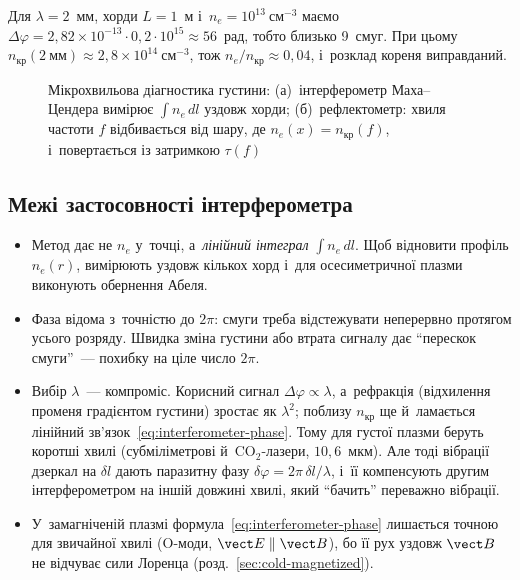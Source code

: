 \begin{Estimate}
Для $\lambda=2$~мм, хорди $L=1$~м і~$n_e=10^{13}~\text{см}^{-3}$ маємо
$\Delta\varphi=2{,}82\times10^{-13}\cdot0{,}2\cdot10^{15}\approx56$~рад, тобто близько 9~смуг. При
цьому $n_{\mathrm{кр}}(2~\text{мм})\approx2{,}8\times10^{14}~\text{см}^{-3}$, тож $n_e/n_{\mathrm{кр}}\approx0{,}04$,
і~розклад кореня виправданий.
\end{Estimate}

\begin{figure}[ht]\centering
	\begin{subfigure}[t]{0.5\linewidth}\centering
		\caption{}
	\end{subfigure}%
	\begin{subfigure}[t]{0.5\linewidth}\centering
		\caption{}
	\end{subfigure}
	\caption{Мікрохвильова діагностика густини: (а)~інтерферометр Маха--Цендера вимірює
	$\int n_e\,dl$ уздовж хорди; (б)~рефлектометр: хвиля частоти $f$ відбивається від шару, де
	$n_e(x)=n_{\mathrm{кр}}(f)$, і~повертається із затримкою $\tau(f)$}
	\label{pic:wave-diagnostics}
\end{figure}

\subsection*{Межі застосовності інтерферометра}

\begin{itemize}
	\item Метод дає не $n_e$ у~точці, а~\emph{лінійний інтеграл} $\int n_e\,dl$. Щоб відновити профіль
	$n_e(r)$, вимірюють уздовж кількох хорд і~для осесиметричної плазми виконують обернення Абеля.
	\item Фаза відома з~точністю до $2\pi$: смуги треба відстежувати неперервно протягом усього
	розряду. Швидка зміна густини або втрата сигналу дає \enquote{перескок смуги}~--- похибку на ціле
	число $2\pi$.
	\item Вибір $\lambda$~--- компроміс. Корисний сигнал $\Delta\varphi\propto\lambda$, а~рефракція
	(відхилення променя градієнтом густини) зростає як $\lambda^2$; поблизу $n_{\mathrm{кр}}$ ще й~ламається
	лінійний зв'язок~\eqref{eq:interferometer-phase}. Тому для густої плазми беруть коротші хвилі
	(субміліметрові й~CO$_2$-лазери, $10{,}6$~мкм). Але тоді вібрації дзеркал на $\delta l$ дають
	паразитну фазу $\delta\varphi=2\pi\,\delta l/\lambda$, і~її компенсують другим інтерферометром на
	іншій довжині хвилі, який \enquote{бачить} переважно вібрації.
	\item У~замагніченій плазмі формула~\eqref{eq:interferometer-phase} лишається точною для звичайної
	хвилі (O-моди, $\vect E\parallel\vect B$), бо її рух уздовж $\vect B$ не відчуває сили Лоренца
	(розд.~\ref{sec:cold-magnetized}).
\end{itemize}

